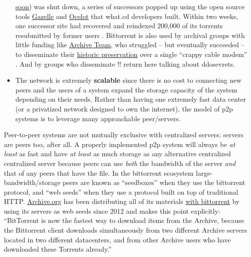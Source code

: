 \documentclass[10pt]{tufte-book}
\begin{document}
\begin{itemize}
  \protect\hyperlink{archives-need-communities}{soon}) was shut down, a
  series of successors popped up using the open source tools
  \href{https://github.com/WhatCD/Gazelle}{Gazelle} and
  \href{https://github.com/WhatCD/Ocelot}{Ocelot} that what.cd
  developers built. Within two weeks, one successor site had recovered
  and reindexed 200,000 of its torrents resubmitted by former users \citep{vandersarWhatCdDead2016} . Bittorrent is also used by archival
  groups with little funding like
  \href{https://wiki.archiveteam.org/index.php/Main_Page}{Archive Team},
  who struggled -- but eventually succeeded -- to disseminate their
  \href{https://wiki.archiveteam.org/index.php/GeoCities_Project}{historic
  preservation} over a single ``crappy cable modem'' \citep{scottGeocitiesTorrentUpdate2010} . And by groups who disseminate !!
  return here talking about ddosevrets.
\item
  The network is extremely \textbf{scalable} since there is no cost to
  connecting new peers and the users of a system expand the storage
  capacity of the system depending on their needs. Rather than having
  one extremely fast data center (or a privatized network designed to
  own the internet), the model of p2p systems is to leverage many
  approachable peer/servers.
\end{itemize}

Peer-to-peer systems are not mutually exclusive with centralized
servers: servers are peers too, after all. A properly implemented p2p
system will always be \emph{at least} as fast and have \emph{at least}
as much storage as any alternative centralized centralized server
because peers can use \emph{both} the bandwidth of the server \emph{and}
that of any peers that have the file. In the bittorrent ecosystem
large-bandwidth/storage peers are known as ``seedboxes''\citep{rossiPeekingBitTorrentSeedbox2014}  when they use the bittorrent
protocol, and ``web seeds''\citep{hoffmanHTTPBasedSeedingSpecification}  when they use a protocol built
on top of traditional HTTP. \href{https://archive.org}{Archive.org} has
been distributing all of its materials
\href{https://archive.org/details/bittorrent}{with bittorrent} by using
its servers as web seeds since 2012 and makes this point explicitly:
``BitTorrent is now the fastest way to download items from the Archive,
because the Bittorrent client downloads simultaneously from two
different Archive servers located in two different datacenters, and from
other Archive users who have downloaded these Torrents already.'' \citep{kahle000000Torrents2012} 
\end{document}
